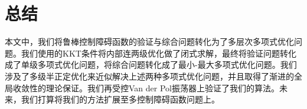 
\chapter{总结}

本文中，我们将鲁棒控制障碍函数的验证与综合问题转化为了多层次多项式优化问题。我们使用的KKT条件将内部连两级优化做了闭式求解，最终将验证问题转化成了单级多项式优化问题，将综合问题转化成了最小-最大多项式优化问题。我们涉及了多级半正定优化来近似解决上述两种多项式优化问题，并且取得了渐进的全局收敛性的理论保证。我们再受控Van der Pol振荡器上验证了我们的算法。未来，我们打算将我们的方法扩展至多控制障碍函数问题上。